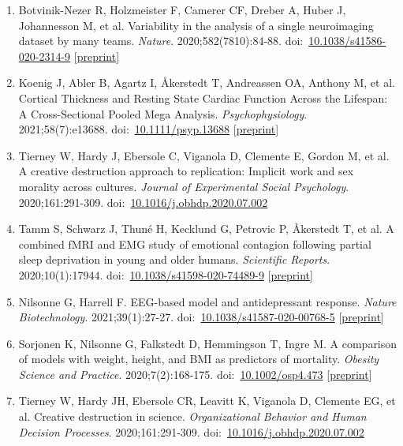 \documentclass[10pt,a4paper,twocolumn]{article}
\begin{document}
\begin{enumerate}
    \item Botvinik-Nezer R, Holzmeister F, Camerer CF, Dreber A, Huber J, Johannesson M, et al. Variability in the analysis of a single neuroimaging dataset by many teams. \textit{Nature}. 2020;582(7810):84-88. doi:~\href{https://doi.org/10.1038/s41586-020-2314-9}{10.1038/s41586-020-2314-9} [\href{https://doi.org/10.1101/843193}{preprint}]

    \item Koenig J, Abler B, Agartz I, Åkerstedt T, Andreassen OA, Anthony M, et al. Cortical Thickness and Resting State Cardiac Function Across the Lifespan: A Cross-Sectional Pooled Mega Analysis. \textit{Psychophysiology}. 2021;58(7):e13688. doi:~\href{https://doi.org/10.1111/psyp.13688}{10.1111/psyp.13688} [\href{https://doi.org/10.31219/osf.io/btjpw}{preprint}]

    \item Tierney W, Hardy J, Ebersole C, Viganola D, Clemente E, Gordon M, et al. A creative destruction approach to replication: Implicit work and sex morality across cultures. \textit{Journal of Experimental Social Psychology}. 2020;161:291-309. doi:~\href{https://doi.org/10.1016/j.obhdp.2020.07.002}{10.1016/j.obhdp.2020.07.002}

    \item Tamm S, Schwarz J, Thuné H, Kecklund G, Petrovic P, Åkerstedt T, et al. A combined fMRI and EMG study of emotional contagion following partial sleep deprivation in young and older humans. \textit{Scientific Reports}. 2020;10(1):17944. doi:~\href{https://doi.org/10.1038/s41598-020-74489-9}{10.1038/s41598-020-74489-9} [\href{https://doi.org/10.31234/osf.io/k6acx}{preprint}]

    \item Nilsonne G, Harrell F. EEG-based model and antidepressant response. \textit{Nature Biotechnology}. 2021;39(1):27-27. doi:~\href{https://doi.org/10.1038/s41587-020-00768-5}{10.1038/s41587-020-00768-5} [\href{https://doi.org/10.31234/osf.io/hqxzd}{preprint}]

    \item Sorjonen K, Nilsonne G, Falkstedt D, Hemmingson T, Ingre M. A comparison of models with weight, height, and BMI as predictors of mortality. \textit{Obesity Science and Practice}. 2020;7(2):168-175. doi:~\href{https://doi.org/10.1002/osp4.473}{10.1002/osp4.473} [\href{https://doi.org/10.31234/osf.io/xamzc}{preprint}]

    \item Tierney W, Hardy JH, Ebersole CR, Leavitt K, Viganola D, Clemente EG, et al. Creative destruction in science. \textit{Organizational Behavior and Human Decision Processes}. 2020;161:291-309. doi:~\href{https://doi.org/10.1016/j.obhdp.2020.07.002}{10.1016/j.obhdp.2020.07.002}


\end{enumerate}
\end{document}
